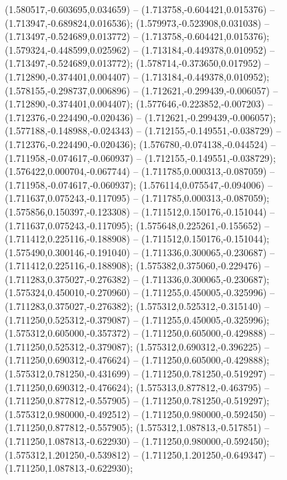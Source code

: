  (1.580517,-0.603695,0.034659) -- (1.713758,-0.604421,0.015376) -- (1.713947,-0.689824,0.016536);
 (1.579973,-0.523908,0.031038) -- (1.713497,-0.524689,0.013772) -- (1.713758,-0.604421,0.015376);
 (1.579324,-0.448599,0.025962) -- (1.713184,-0.449378,0.010952) -- (1.713497,-0.524689,0.013772);
 (1.578714,-0.373650,0.017952) -- (1.712890,-0.374401,0.004407) -- (1.713184,-0.449378,0.010952);
 (1.578155,-0.298737,0.006896) -- (1.712621,-0.299439,-0.006057) -- (1.712890,-0.374401,0.004407);
 (1.577646,-0.223852,-0.007203) -- (1.712376,-0.224490,-0.020436) -- (1.712621,-0.299439,-0.006057);
 (1.577188,-0.148988,-0.024343) -- (1.712155,-0.149551,-0.038729) -- (1.712376,-0.224490,-0.020436);
 (1.576780,-0.074138,-0.044524) -- (1.711958,-0.074617,-0.060937) -- (1.712155,-0.149551,-0.038729);
 (1.576422,0.000704,-0.067744) -- (1.711785,0.000313,-0.087059) -- (1.711958,-0.074617,-0.060937);
 (1.576114,0.075547,-0.094006) -- (1.711637,0.075243,-0.117095) -- (1.711785,0.000313,-0.087059);
 (1.575856,0.150397,-0.123308) -- (1.711512,0.150176,-0.151044) -- (1.711637,0.075243,-0.117095);
 (1.575648,0.225261,-0.155652) -- (1.711412,0.225116,-0.188908) -- (1.711512,0.150176,-0.151044);
 (1.575490,0.300146,-0.191040) -- (1.711336,0.300065,-0.230687) -- (1.711412,0.225116,-0.188908);
 (1.575382,0.375060,-0.229476) -- (1.711283,0.375027,-0.276382) -- (1.711336,0.300065,-0.230687);
 (1.575324,0.450010,-0.270960) -- (1.711255,0.450005,-0.325996) -- (1.711283,0.375027,-0.276382);
 (1.575312,0.525312,-0.315140) -- (1.711250,0.525312,-0.379087) -- (1.711255,0.450005,-0.325996);
 (1.575312,0.605000,-0.357372) -- (1.711250,0.605000,-0.429888) -- (1.711250,0.525312,-0.379087);
 (1.575312,0.690312,-0.396225) -- (1.711250,0.690312,-0.476624) -- (1.711250,0.605000,-0.429888);
 (1.575312,0.781250,-0.431699) -- (1.711250,0.781250,-0.519297) -- (1.711250,0.690312,-0.476624);
 (1.575313,0.877812,-0.463795) -- (1.711250,0.877812,-0.557905) -- (1.711250,0.781250,-0.519297);
 (1.575312,0.980000,-0.492512) -- (1.711250,0.980000,-0.592450) -- (1.711250,0.877812,-0.557905);
 (1.575312,1.087813,-0.517851) -- (1.711250,1.087813,-0.622930) -- (1.711250,0.980000,-0.592450);
 (1.575312,1.201250,-0.539812) -- (1.711250,1.201250,-0.649347) -- (1.711250,1.087813,-0.622930);
